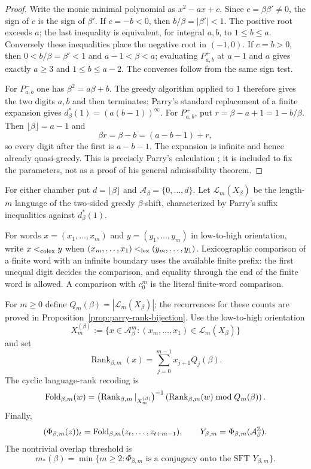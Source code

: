\begin{proof}
Write the monic minimal polynomial as $x^2-ax+c$.  Since
$c=\beta\beta'\ne0$, the sign of $c$ is the sign of $\beta'$.  If
$c=-b<0$, then $b/\beta=|\beta'|<1$.  The positive root exceeds $a$;
the last inequality is equivalent, for integral $a,b$, to $1\le b\le a$.
Conversely these inequalities place the negative root in $(-1,0)$.
If $c=b>0$, then $0<b/\beta=\beta'<1$ and $a-1<\beta<a$; evaluating
$P^+_{a,b}$ at $a-1$ and $a$ gives exactly $a\ge3$ and
$1\le b\le a-2$.  The converses follow from the same sign test.

For $P^-_{a,b}$ one has $\beta^2=a\beta+b$.  The greedy algorithm applied
to $1$ therefore gives the two digits $a,b$ and then terminates; Parry's
standard replacement of a finite expansion gives
$d_\beta^*(1)=(a(b-1))^\infty$.  For $P^+_{a,b}$, put
$r=\beta-a+1=1-b/\beta$.  Then
$\lfloor\beta\rfloor=a-1$ and
\[
\beta r=\beta-b=(a-b-1)+r,
\]
so every digit after the first is $a-b-1$.  The expansion is infinite and
hence already quasi-greedy.  This is precisely Parry's calculation
\cite{Parry1960}; it is included to fix the parameters, not as a proof of
his general admissibility theorem.
\end{proof}

For either chamber put $d=\lfloor\beta\rfloor$ and
$\mathcal A_\beta=\{0,\ldots,d\}$.  Let $\mathcal L_m(X_\beta)$ be the
length-$m$ language of the two-sided greedy $\beta$-shift, characterized by
Parry's suffix inequalities against $d_\beta^*(1)$.

For words $x=(x_1,\ldots,x_m)$ and $y=(y_1,\ldots,y_m)$ in low-to-high
orientation, write $x<_{\rm colex}y$ when
$(x_m,\ldots,x_1)<_{\rm lex}(y_m,\ldots,y_1)$.  Lexicographic comparison of a
finite word with an infinite boundary uses the available finite prefix: the
first unequal digit decides the comparison, and equality through the end of
the finite word is allowed.  A comparison with $c_0^m$ is the literal
finite-word comparison.

\begin{definition}
\label{def:quadratic-parry-fold}
For $m\ge0$ define $Q_m(\beta)=|\mathcal L_m(X_\beta)|$; the recurrences for
these counts are proved in Proposition~\ref{prop:parry-rank-bijection}.
Use the low-to-high orientation
\[
X_m^{(\beta)}:=\{x\in\mathcal A_\beta^m:
(x_m,\ldots,x_1)\in\mathcal L_m(X_\beta)\}
\]
and set
\[
\operatorname{Rank}_{\beta,m}(x)=\sum_{j=0}^{m-1}x_{j+1}Q_j(\beta).
\]
The cyclic language-rank recoding is
\[
\mathrm{Fold}_{\beta,m}(w)=
\bigl(\operatorname{Rank}_{\beta,m}|_{X_m^{(\beta)}}\bigr)^{-1}
\left(\operatorname{Rank}_{\beta,m}(w)\bmod Q_m(\beta)\right).
\]
Finally,
\[
(\Phi_{\beta,m}(z))_t
=\mathrm{Fold}_{\beta,m}(z_t,\ldots,z_{t+m-1}),\qquad
Y_{\beta,m}=\Phi_{\beta,m}(\mathcal A_\beta^{\mathbb Z}).
\]
The nontrivial overlap threshold is
\[
m_*(\beta)=\min\{m\ge2:\Phi_{\beta,m}\text{ is a conjugacy onto the
SFT }Y_{\beta,m}\}.
\]
\end{definition}

